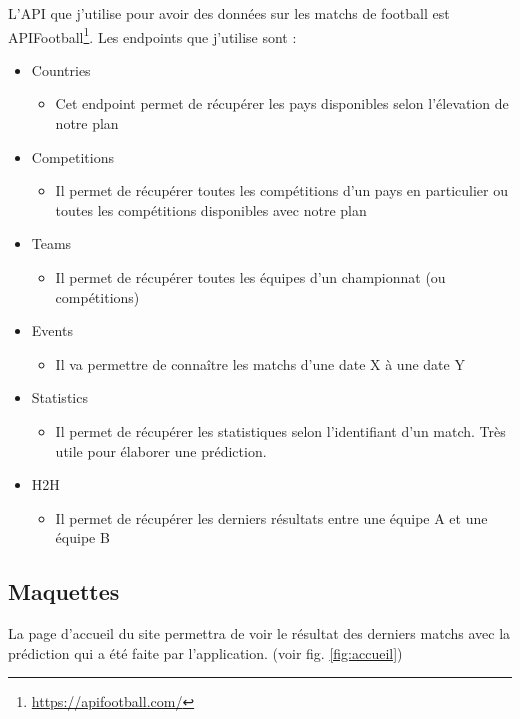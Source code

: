 \documentclass[a4paper,14pt]{extarticle}
\begin{document}
{L'API que j'utilise pour avoir des données sur les matchs de football est APIFootball\footnote{\url{https://apifootball.com/}}. Les endpoints que j'utilise sont : 
\begin{itemize}
    \item Countries
    \begin{itemize}
        \item Cet endpoint permet de récupérer les pays disponibles selon l'élevation de notre plan
    \end{itemize}
    \item Competitions
    \begin{itemize}
        \item Il permet de récupérer toutes les compétitions d'un pays en particulier ou toutes les compétitions disponibles avec notre plan
    \end{itemize}
    \item Teams
    \begin{itemize}
        \item Il permet de récupérer toutes les équipes d'un championnat (ou compétitions)
    \end{itemize}
    \item Events
    \begin{itemize}
        \item Il va permettre de connaître les matchs d'une date X à une date Y
    \end{itemize}
    \item Statistics
    \begin{itemize}
        \item Il permet de récupérer les statistiques selon l'identifiant d'un match. Très utile pour élaborer une prédiction.
    \end{itemize}
    \item H2H 
    \begin{itemize}
        \item Il permet de récupérer les derniers résultats entre une équipe A et une équipe B
    \end{itemize}
\end{itemize}

\subsection{Maquettes}
La page d'accueil du site permettra de voir le résultat des derniers matchs avec la prédiction qui a été faite par l'application. (voir fig. \ref{fig:accueil})

}
\end{document}
